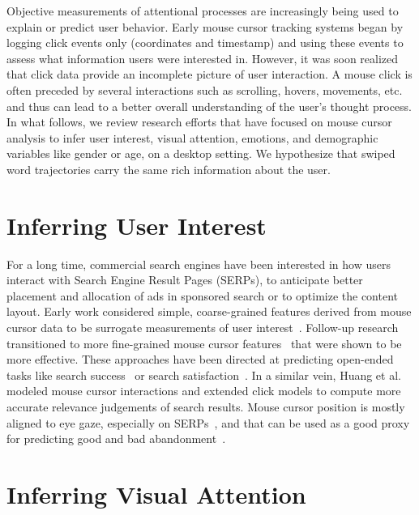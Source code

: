 \documentclass[11pt,oneside,a4paper,openright]{book}
\begin{document}
Objective measurements of attentional processes are increasingly being used to explain or predict user behavior.
Early mouse cursor tracking systems began by logging click events only (coordinates and timestamp)
and using these events to assess what information users were interested in.
However, it was soon realized that click data provide an incomplete picture of user interaction.
A mouse click is often preceded by several interactions such as scrolling, hovers, movements, etc.
and thus can lead to a better overall understanding of the user's thought process.\\

In what follows, we review research efforts that have focused on mouse cursor analysis
to infer user interest, visual attention, emotions, and demographic variables like gender or age, on a desktop setting.
We hypothesize that swiped word trajectories carry the same rich information about the user.

\section{Inferring User Interest}
\label{sec:interest}

For a long time, commercial search engines have been interested in how users interact with Search Engine Result Pages (SERPs),
to anticipate better placement and allocation of ads in sponsored search or to optimize the content layout.
Early work considered simple, coarse-grained features derived from mouse cursor data
to be surrogate measurements of user interest~\cite{Claypool01_iii, Shapira06_ii}.
Follow-up research transitioned to more fine-grained mouse cursor features~\cite{Guo08_query,
Guo10_buy}
that were shown to be more effective.
These approaches have been directed at predicting open-ended tasks
like search success~\cite{Guo12_success} or search satisfaction~\cite{Liu15_opinions}.
In a similar vein, Huang et al.~\cite{Huang12_search, Huang11_clicks}
modeled mouse cursor interactions and extended click models to compute more accurate relevance judgements of search results.
Mouse cursor position is mostly aligned to eye gaze,
especially on SERPs~\cite{Guo12_rel, Speicher13_rel},
and that can be used as a good proxy for predicting good and bad abandonment~\cite{Diriye12_leaving}.

\section{Inferring Visual Attention}
\label{sec:attention}
\end{document}
